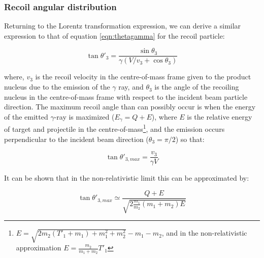 \subsubsection{Recoil angular distribution}

Returning to the Lorentz transformation expression, we can derive a similar expression to that of equation \ref{eqn:thetagamma} for the recoil particle:

\begin{equation}
\tan{\theta'_{3}} = \frac{\sin{\theta_{3}}}{\gamma(V/v_{3}+\cos{\theta_{3}})}
\end{equation}

where, $v_{3}$ is the recoil velocity in the centre-of-mass frame given to the product nucleus due to the emission of the $\gamma$ ray, and $\theta_{3}$ is the angle of the recoiling nucleus in the centre-of-mass frame with respect to the incident beam particle direction. The maximum recoil angle than can possibly occur is when the energy of the emitted $\gamma$-ray is maximized ($E_{\gamma}=Q+E$), where $E$ is the relative energy of target and projectile in the centre-of-mass\footnote{ $E=\sqrt{2m_{2}(T'_{1}+m_{1})+m_{1}^{2}+m_{2}^{2}}-m_{1}-m_{2}$, and in the non-relativistic approximation $E=\frac{m_{2}}{m_{1}+m_{2}}T'_{1}$ }, and the emission occurs perpendicular to the incident beam direction ($\theta_{3}=\pi/2$) so that:

\begin{equation}
\tan{\theta'_{3,max}}=\frac{v_{3}}{\gamma V}
\end{equation} 

It can be shown that in the non-relativistic limit this can be approximated by:

\begin{equation} \label{eq:6}
\tan{\theta'_{3,max}}\simeq\frac{Q+E}{\sqrt{2\frac{m_{1}}{m_{2}}(m_{1}+m_{2})E}}
\end{equation}


